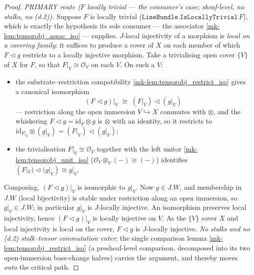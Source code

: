 \begin{proof}
  \leanok

\emph{PRIMARY route (\(F\) locally trivial --- the consumer's case; sheaf-level,
  no stalks, no (d.2)).} Suppose \(F\) is locally trivial
  (\(\mathtt{LineBundle.IsLocallyTrivial}\,F\)), which is exactly the hypothesis its
  sole consumer --- the associator \ref{mk-lem:tensorobj_assoc_iso} --- supplies.
  \(J\)-local injectivity of a morphism is \emph{local on a covering family}: it
  suffices to produce a cover of \(X\) on each member of which \(F \triangleleft g\)
  restricts to a locally injective morphism. Take a trivialising open cover
  \(\{V\}\) of \(X\) for \(F\), so that \(F|_V \cong \mathcal{O}_V\) on each \(V\).
  On such a \(V\):
  \begin{itemize}
    \item the substrate--restriction compatibility \ref{mk-lem:tensorobj_restrict_iso}
      gives a canonical isomorphism
      \[
        (F \triangleleft g)\big|_V \;\cong\; (F|_V) \triangleleft (g|_V)
      \]
      --- restriction along the open immersion \(V \hookrightarrow X\) commutes with
      \(\otimes\), and the whiskering \(F \triangleleft g = \mathrm{id}_F \otimes g\)
      is \(\otimes\) with an identity, so it restricts to \(\mathrm{id}_{F|_V}
      \otimes (g|_V) = (F|_V) \triangleleft (g|_V)\);
    \item the trivialisation \(F|_V \cong \mathcal{O}_V\) together with the left
      unitor \ref{mk-lem:tensorobj_unit_iso} (\(\mathcal{O}_V \otimes_V (-) \cong
      (-)\)) identifies \((F|_V) \triangleleft (g|_V) \cong g|_V\).
  \end{itemize}
  Composing, \((F \triangleleft g)|_V\) is isomorphic to \(g|_V\). Now \(g \in J.W\),
  and membership in \(J.W\) (local bijectivity) is stable under restriction along an
  open immersion, so \(g|_V \in J.W\); in particular \(g|_V\) is \(J\)-locally
  injective. An isomorphism preserves local injectivity, hence \((F \triangleleft
  g)|_V\) is locally injective on \(V\). As the \(\{V\}\) cover \(X\) and local
  injectivity is local on the cover, \(F \triangleleft g\) is \(J\)-locally
  injective. \emph{No stalks and no (d.2) stalk--tensor commutation enter}; the
  single comparison lemma \ref{mk-lem:tensorobj_restrict_iso} (a presheaf-level
  comparison, decomposed into its two open-immersion base-change halves) carries the
  argument, and thereby moves \emph{onto} the critical path.


\end{proof}
